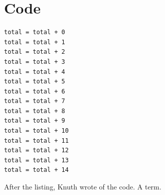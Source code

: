 \documentclass{article}
\begin{document}
\printindex[names]
\section{Code}
\begin{verbatim}
total = total + 0
total = total + 1
total = total + 2
total = total + 3
total = total + 4
total = total + 5
total = total + 6
total = total + 7
total = total + 8
total = total + 9
total = total + 10
total = total + 11
total = total + 12
total = total + 13
total = total + 14
\end{verbatim}
After the listing, Knuth wrote of the
code. A term.
\printindex
\printindex[terms]
\end{document}
